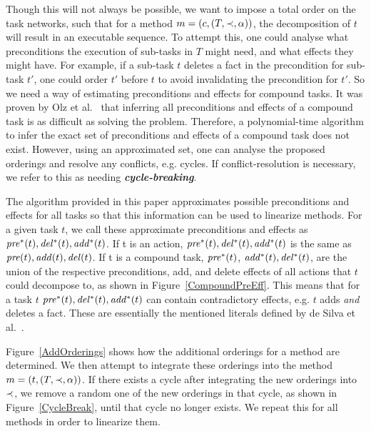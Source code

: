 \documentclass[runningheads]{llncs}
\begin{document}
Though this will not always be possible, we want to impose a total order on the task networks, such that for a method $m = (c, (T, \mathit{ \mathord{\prec} }, \alpha))$, the decomposition of $t$ will result in an executable sequence. To attempt this, one could analyse what preconditions the execution of sub-tasks in $T$ might need, and what effects they might have. For example, if a sub-task $t$ deletes a fact in the precondition for sub-task $t'$, one could order $t'$ before $t$ to avoid invalidating the precondition for $t'$. So we need a way of estimating preconditions and effects for compound tasks. It was proven by Olz et al.\ \cite{ConnyPreEstimation} that inferring all preconditions and effects of a compound task is as difficult as solving the problem. Therefore, a polynomial-time algorithm to infer the exact set of preconditions and effects of a compound task does not exist. However, using an approximated set, one can analyse the proposed orderings and resolve any conflicts, e.g. cycles. If conflict-resolution is necessary, we refer to this as needing \textbf{\textit{cycle-breaking}}.

The algorithm provided in this paper approximates possible preconditions and effects for all tasks so that this information can be used to linearize methods. 
For a given task $t$, we  call these approximate preconditions and effects as $\mathit{pre^{*}}(t), \mathit{del^{*}}(t), \mathit{add^{*}}(t)$.
If t is an action, $\mathit{pre^{*}}(t), \mathit{del^{*}}(t), \mathit{add^{*}}(t)$ is the same as $\mathit{pre}(t), \mathit{add}(t), \mathit{del}(t)$. 
If t is a compound task, $\mathit{pre^{*}}(t)$, $\mathit{add^{*}}(t),  \mathit{del^{*}}(t)$, are the union of the respective preconditions, add, and delete effects of all actions that $t$ could decompose to, as shown in Figure~\ref{CompoundPreEff}.
This means that for a task $t$ $\mathit{pre^{*}}(t), \mathit{del^{*}}(t), \mathit{add^{*}}(t)$ can contain contradictory effects, e.g. $t$ adds \emph{and} deletes a fact. These are essentially the mentioned literals defined by de Silva et al.\ \cite{mentionedliterals}.

Figure~\ref{AddOrderings} shows how the additional orderings for a method are determined. We then attempt to integrate these orderings into the method $m = (t, (T, \mathit{ \mathord{\prec} }, \alpha))$. If there exists a cycle after integrating the new orderings into $\mathit{ \mathord{\prec} }$, we remove a random one of the new orderings in that cycle, as shown in Figure~\ref{CycleBreak}, until that cycle no longer exists.
We repeat this for all methods in order to linearize them.
\end{document}
